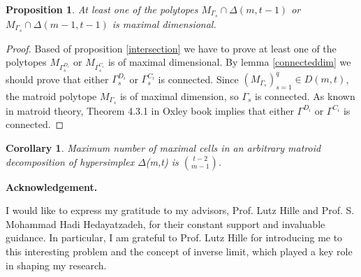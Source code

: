 \documentclass[12pt, reqno]{amsart}
\newtheorem{proposition}[theorem]{Proposition}
\newtheorem{corollary}[theorem]{Corollary}
\theoremstyle{definition}
\theoremstyle{remark}
\numberwithin{equation}{section}
\begin{document}
  
  
  
  
  \begin{proposition}
  	At least one of the polytopes
  	 $M_{\Gamma_s}\cap \Delta(m,t-1)$
  	or
  	$M_{\Gamma_s}\cap \Delta(m-1,t-1)$
  	is maximal dimensional.
  \end{proposition}
  
  \begin{proof}
  	Based of proposition \ref{intersection} we have to prove at least one of the polytopes
  	$M_{\Gamma_s^{D_i}}$ or 
  	$M_{\Gamma_s^{C_i}}$
  	is of maximal dimensional. By lemma \ref{connecteddim} we should prove that 
  	either
  		$\Gamma_s^{D_i}$ or 
  	$\Gamma_s^{C_i}$
  	 is connected. Since
  	 	$(M_{\Gamma_s})^q_{s=1}\in D(m,t)$,
  	  the matroid polytope $M_{\Gamma_s}$ is of maximal dimension, so 
  	$\Gamma_s$ is connected. As known in matroid theory, Theorem 4.3.1 in Oxley book \cite{Ox} implies that either 
  	  $\Gamma^{D_i}$ or 
  	  $\Gamma^{C_i}$
  	  is connected.
  \end{proof}
  
  
  
  \begin{corollary}
  Maximum number of maximal cells in an arbitrary matroid decomposition of hypersimplex $\Delta$(m,t) is
  $\binom{t-2}{m-1}$.
  	
  \end{corollary}
  

%

{\bf Acknowledgement.} 

I would like to express my gratitude to my advisors, Prof. Lutz Hille and Prof. S. Mohammad Hadi Hedayatzadeh, for their constant support and invaluable guidance. In particular, I am grateful to Prof. Lutz Hille for introducing me to this interesting problem and the concept of inverse limit, which played a key role in shaping my research.
\end{document}
